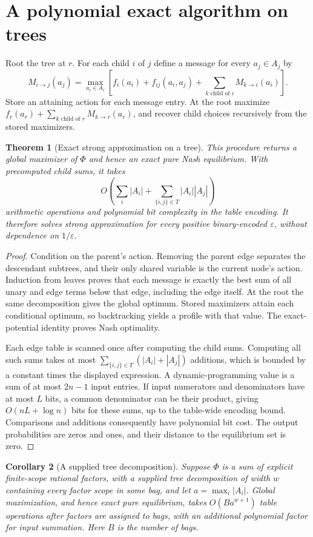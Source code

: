 \documentclass[11pt,a4paper]{article}
\newtheorem{theorem}{Theorem}[section]
\newtheorem{corollary}[theorem]{Corollary}
\theoremstyle{definition}
\theoremstyle{remark}
\begin{document}
\section{A polynomial exact algorithm on trees}
Root the tree at $r$. For each child $i$ of $j$ define a message for every $a_j\in A_j$ by
\[
 M_{i\to j}(a_j)=\max_{a_i\in A_i}
  \left[f_i(a_i)+f_{ij}(a_i,a_j)
              +\sum_{k\text{ child of }i}M_{k\to i}(a_i)\right].
\]
Store an attaining action for each message entry. At the root maximize
$f_r(a_r)+\sum_{k\text{ child of }r}M_{k\to r}(a_r)$,
and recover child choices recursively from the stored maximizers.
\begin{theorem}[Exact strong approximation on a tree]
This procedure returns a global maximizer of $\Phi$ and hence an exact pure Nash equilibrium. With precomputed child sums, it takes
\[
 O\left(\sum_i|A_i|+\sum_{\{i,j\}\in T}|A_i||A_j|\right)
\]
arithmetic operations and polynomial bit complexity in the table encoding. It therefore solves strong approximation for every positive binary-encoded $\varepsilon$, without dependence on $1/\varepsilon$.
\end{theorem}
\begin{proof}
Condition on the parent's action. Removing the parent edge separates the descendant subtrees, and their only shared variable is the current node's action. Induction from leaves proves that each message is exactly the best sum of all unary and edge terms below that edge, including the edge itself. At the root the same decomposition gives the global optimum. Stored maximizers attain each conditional optimum, so backtracking yields a profile with that value. The exact-potential identity proves Nash optimality.

Each edge table is scanned once after computing the child sums. Computing all such sums takes at most $\sum_{\{i,j\}\in T}(|A_i|+|A_j|)$ additions, which is bounded by a constant times the displayed expression. A dynamic-programming value is a sum of at most $2n-1$ input entries. If input numerators and denominators have at most $L$ bits, a common denominator can be their product, giving $O(nL+\log n)$ bits for these sums, up to the table-wide encoding bound. Comparisons and additions consequently have polynomial bit cost. The output probabilities are zeros and ones, and their distance to the equilibrium set is zero.
\end{proof}
\begin{corollary}[A supplied tree decomposition]
Suppose $\Phi$ is a sum of explicit finite-scope rational factors, with a supplied tree decomposition of width $w$ containing every factor scope in some bag, and let $a=\max_i|A_i|$. Global maximization, and hence exact pure equilibrium, takes $O(Ba^{w+1})$ table operations after factors are assigned to bags, with an additional polynomial factor for input summation. Here $B$ is the number of bags.
\end{corollary}
\end{document}
